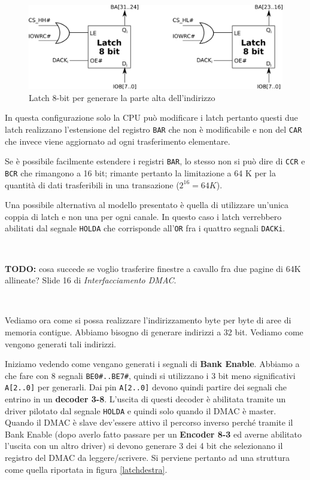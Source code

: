 \documentclass[11pt]{book}
\begin{document}
\begin{figure}[h]
  \centering
  \includegraphics[width=.8\textwidth]{images/estensionelatch.png}
  \caption{Latch 8-bit per generare la parte alta dell'indirizzo}
  \label{estensionelatch}
\end{figure}

In questa configurazione solo la CPU pu\`o modificare i latch pertanto
questi due latch realizzano l'estensione del registro \texttt{BAR} che
non \`e modificabile e non del {\tt CAR} che invece viene aggiornato
ad ogni trasferimento elementare.

Se \`e possibile facilmente estendere i registri \texttt{BAR}, lo
stesso non si pu\`o dire di \texttt{CCR} e \texttt{BCR} che rimangono
a 16 bit; rimante pertanto la limitazione a 64 K per la quantit\`a di
dati trasferibili in una transazione ($2^{16} = 64 K$).

Una possibile alternativa al modello presentato \`e quella di
utilizzare un'unica coppia di latch e non una per ogni canale. In
questo caso i latch verrebbero abilitati dal segnale \texttt{HOLDA}
che corrisponde all'\texttt{OR} fra i quattro segnali \texttt{DACKi}.

\

\textbf{TODO:} cosa succede se voglio trasferire finestre a cavallo
fra due pagine di 64K allineate? Slide 16 di \textit{Interfacciamento
  DMAC}.

\

Vediamo ora come si possa realizzare l'indirizzamento byte per byte di
aree di memoria contigue. Abbiamo bisogno di generare indirizzi a 32
bit. Vediamo come vengono generati tali indirizzi.

Iniziamo vedendo come vengano generati i segnali di \textbf{Bank
  Enable}. Abbiamo a che fare con 8 segnali \texttt{BE0\#..BE7\#},
quindi si utilizzano i 3 bit meno significativi \texttt{A[2..0]} per
generarli. Dai pin \texttt{A[2..0]} devono quindi partire dei segnali
che entrino in un \textbf{decoder 3-8}. L'uscita di questi decoder \`e
abilitata tramite un driver pilotato dal segnale \texttt{HOLDA} e
quindi solo quando il DMAC \`e master. Quando il DMAC \`e slave
dev'essere attivo il percorso inverso perch\'e tramite il Bank Enable
(dopo averlo fatto passare per un \textbf{Encoder 8-3} ed averne
abilitato l'uscita con un altro driver) si devono generare 3 dei 4 bit
che selezionano il registro del DMAC da leggere/scrivere. Si perviene
pertanto ad una struttura come quella riportata in figura
\ref{latchdestra}.
\end{document}
